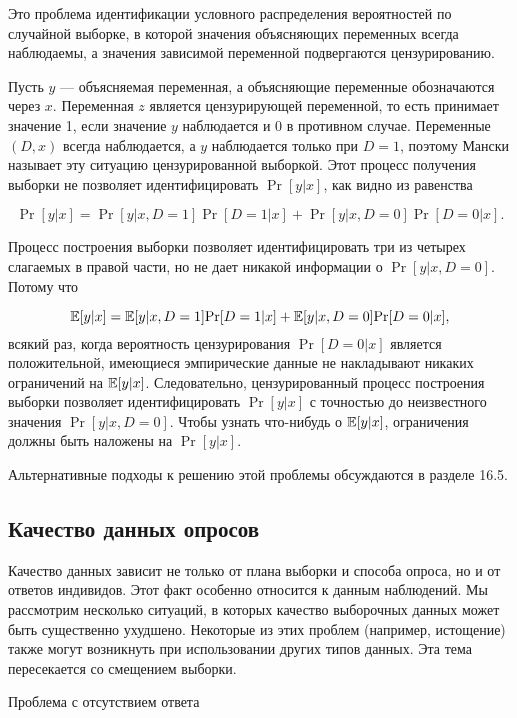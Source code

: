 Это проблема идентификации условного распределения вероятностей по случайной выборке, в которой  значения объясняющих переменных всегда наблюдаемы, а значения зависимой переменной подвергаются цензурированию.


Пусть $y$ --- объясняемая переменная, а объясняющие переменные обозначаются через $x$. Переменная $z$ является цензурирующей переменной, то есть принимает значение 1, если значение $y$ наблюдается и 0 в противном случае. Переменные $(D, x)$ всегда наблюдается, а $y$ наблюдается только при $D = 1$, поэтому Мански называет эту ситуацию цензурированной выборкой. Этот процесс получения выборки  не позволяет идентифицировать $\Pr[y|x]$, как видно из равенства

\begin{equation}
\Pr[y|x]=\Pr[y|x,D=1]\Pr[D=1|x]+\Pr[y|x,D=0]\Pr[D=0|x].
\end{equation}

Процесс построения выборки позволяет идентифицировать три из четырех слагаемых в правой части, но не дает никакой информации о  
$\Pr[y|x, D = 0]$. Потому что

\[
\mathbb{E}[y|x]=\mathbb{E}[y|x,D=1]\mathrm{Pr}[D=1|x]+\mathbb{E}[y|x,D=0]\mathrm{Pr}[D=0|x],
\]
всякий раз, когда вероятность цензурирования $\Pr[D=0|x]$ является положительной, имеющиеся эмпирические данные не накладывают никаких ограничений на $\mathbb{E}[y|x]$. Следовательно, цензурированный процесс построения выборки позволяет идентифицировать $\Pr[y|x]$ с точностью до неизвестного значения $\Pr[y|x,D=0]$. Чтобы узнать что-нибудь о $\mathbb{E}[y|x]$, ограничения должны быть наложены на $\Pr[y|x]$.


Альтернативные подходы к решению этой проблемы обсуждаются в разделе 16.5.


\subsection{Качество данных опросов}

Качество данных зависит не только от плана выборки и способа опроса, но и от ответов индивидов. Этот факт особенно относится к данным наблюдений. Мы рассмотрим несколько ситуаций, в которых качество выборочных данных может быть существенно ухудшено. Некоторые из этих проблем (например, истощение) также могут возникнуть при использовании других типов данных. Эта тема пересекается со смещением выборки.


\begin{center}
Проблема с отсутствием ответа
\end{center}


